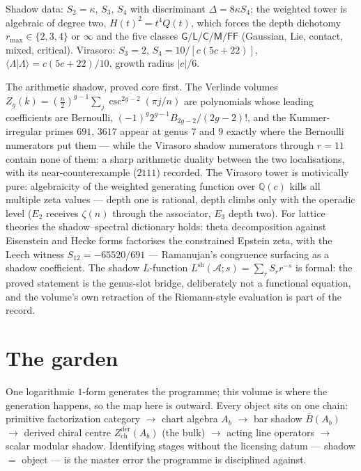 \documentclass[11pt]{article}
\providecommand{\cA}{\mathcal{A}}
\providecommand{\bQ}{\mathbb{Q}}
\providecommand{\barB}{\overline{B}}
\providecommand{\Zder}{Z^{\mathrm{der}}_{\mathrm{ch}}}
\begin{document}
Shadow data: $S_2=\kappa$, $S_3$, $S_4$ with discriminant
$\Delta=8\kappa S_4$; the weighted tower is algebraic of degree two,
$H(t)^2=t^4Q(t)$, which forces the depth dichotomy $r_{\max}\in
\{2,3,4\}$ or $\infty$ and the five classes
$\mathsf G/\mathsf L/\mathsf C/\mathsf M/\mathsf{FF}$
\textup{(Gaussian, Lie, contact, mixed, critical)}. Virasoro:
$S_3=2$, $S_4=10/[c(5c+22)]$, $\langle\Lambda|\Lambda\rangle
=c(5c+22)/10$, growth radius $|c|/6$.

The arithmetic shadow, proved core first. The Verlinde volumes
$Z_g(k)=(\tfrac n2)^{g-1}\sum_{j}\csc^{2g-2}(\pi j/n)$ are
polynomials whose leading coefficients are Bernoulli,
$(-1)^g2^{g-1}B_{2g-2}/(2g-2)!$, and the Kummer-irregular primes
$691$, $3617$ appear at genus $7$ and $9$ exactly where the Bernoulli
numerators put them --- while the Virasoro shadow numerators through
$r=11$ contain none of them: a sharp arithmetic duality between the
two localisations, with its near-counterexample ($2111$) recorded.
The Virasoro tower is motivically pure: algebraicity of the weighted
generating function over $\bQ(c)$ kills all multiple zeta values ---
depth one is rational, depth climbs only with the operadic level
\textup{($E_2$ receives $\zeta(n)$ through the associator, $E_3$
depth two)}. For lattice theories the shadow--spectral dictionary
holds: theta decomposition against Eisenstein and Hecke forms
factorises the constrained Epstein zeta, with the Leech witness
$S_{12}=-65520/691$ --- Ramanujan's congruence surfacing as a shadow
coefficient. The shadow $L$-function
$L^{\mathrm{sh}}(\cA;s)=\sum_rS_rr^{-s}$ is formal: the proved
statement is the genus-slot bridge, deliberately not a functional
equation, and the volume's own retraction of the Riemann-style
evaluation is part of the record.

\section{The garden}\label{sec:garden}

One logarithmic $1$-form generates the programme; this volume is
where the generation happens, so the map here is outward. Every
object sits on one chain: primitive factorization category $\to$
chart algebra $A_b$ $\to$ bar shadow $\barB(A_b)$ $\to$ derived
chiral centre $\Zder(A_b)$ \textup{(the bulk)} $\to$ acting line
operators $\to$ scalar modular shadow. Identifying stages without the
licensing datum --- shadow $=$ object --- is the master error the
programme is disciplined against.
\end{document}
